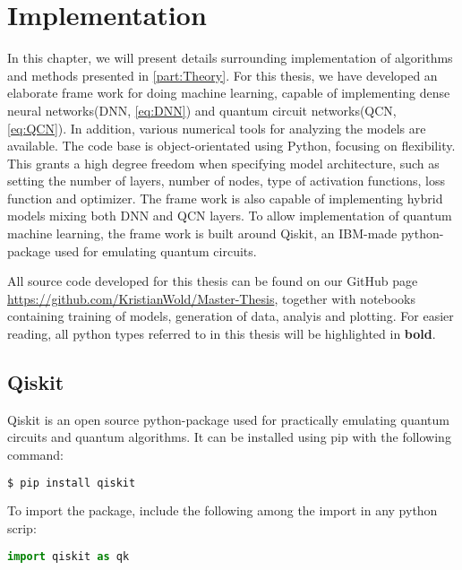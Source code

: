 \chapter{Implementation}\label{chap:implementation}
In this chapter, we will present details surrounding implementation of algorithms and methods presented in \autoref{part:Theory}. For this thesis, we have developed an elaborate frame work for doing machine learning, capable of implementing dense neural networks(DNN, \autoref{eq:DNN}) and quantum circuit networks(QCN, \autoref{eq:QCN}). In addition, various numerical tools for analyzing the models are available. The code base is object-orientated using Python, focusing on flexibility. This grants a high degree freedom when specifying model architecture, such as setting the number of layers, number of nodes, type of activation functions, loss function and optimizer. The frame work is also capable of implementing hybrid models mixing both DNN and QCN layers. To allow implementation of quantum machine learning, the frame work is built around Qiskit\cite{Qiskit}, an IBM-made python-package used for emulating quantum circuits. 

All source code developed for this thesis can be found on our GitHub page \url{https://github.com/KristianWold/Master-Thesis}, together with notebooks containing training of models, generation of data, analyis and plotting. For easier reading, all python types referred to in this thesis will be highlighted in \textbf{bold}.

\section{Qiskit}\label{sec:Qiskit}

Qiskit\cite{Qiskit} is an open source python-package used for practically emulating quantum circuits and quantum algorithms. It can be installed using pip with the following command:

\begin{lstlisting}[language=bash]
  $ pip install qiskit
\end{lstlisting}
To import the package, include the following among the import in any python scrip:
\begin{lstlisting}[language=python]
  import qiskit as qk
\end{lstlisting}

